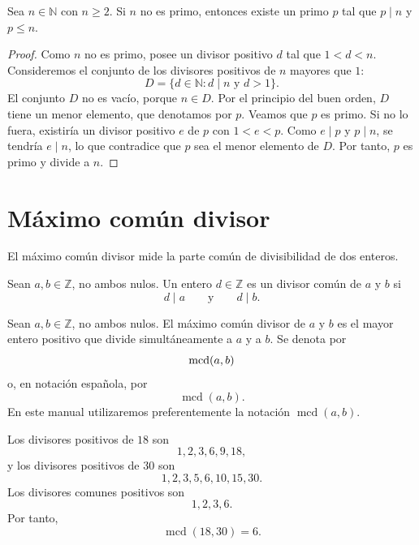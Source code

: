 \begin{proposicion}
Sea \(n\in\mathbb{N}\) con \(n\geq 2\). Si \(n\) no es primo, entonces existe un primo \(p\) tal que \(p\mid n\) y \(p\leq n\).
\end{proposicion}

\begin{proof}
Como \(n\) no es primo, posee un divisor positivo \(d\) tal que \(1<d<n\). Consideremos el conjunto de los divisores positivos de \(n\) mayores que \(1\):
\[
D=\{d\in\mathbb{N}: d\mid n \text{ y } d>1\}.
\]
El conjunto \(D\) no es vacío, porque \(n\in D\). Por el principio del buen orden, \(D\) tiene un menor elemento, que denotamos por \(p\). Veamos que \(p\) es primo. Si no lo fuera, existiría un divisor positivo \(e\) de \(p\) con \(1<e<p\). Como \(e\mid p\) y \(p\mid n\), se tendría \(e\mid n\), lo que contradice que \(p\) sea el menor elemento de \(D\). Por tanto, \(p\) es primo y divide a \(n\).
\end{proof}

\section{Máximo común divisor}

El máximo común divisor mide la parte común de divisibilidad de dos enteros.

\begin{definicion}
Sean \(a,b\in\mathbb{Z}\), no ambos nulos. Un entero \(d\in\mathbb{Z}\) es un divisor común de \(a\) y \(b\) si
\[
d\mid a
\qquad\text{y}\qquad
d\mid b.
\]
\end{definicion}

\begin{definicion}
Sean \(a,b\in\mathbb{Z}\), no ambos nulos. El máximo común divisor de \(a\) y \(b\) es el mayor entero positivo que divide simultáneamente a \(a\) y a \(b\). Se denota por
\[
\operatorname{mcd}(a,b)
\]
o, en notación española, por
\[
\operatorname{mcd}(a,b).
\]
En este manual utilizaremos preferentemente la notación \(\operatorname{mcd}(a,b)\).
\end{definicion}

\begin{ejemplo}
Los divisores positivos de \(18\) son
\[
1,2,3,6,9,18,
\]
y los divisores positivos de \(30\) son
\[
1,2,3,5,6,10,15,30.
\]
Los divisores comunes positivos son
\[
1,2,3,6.
\]
Por tanto,
\[
\operatorname{mcd}(18,30)=6.
\]
\end{ejemplo}

